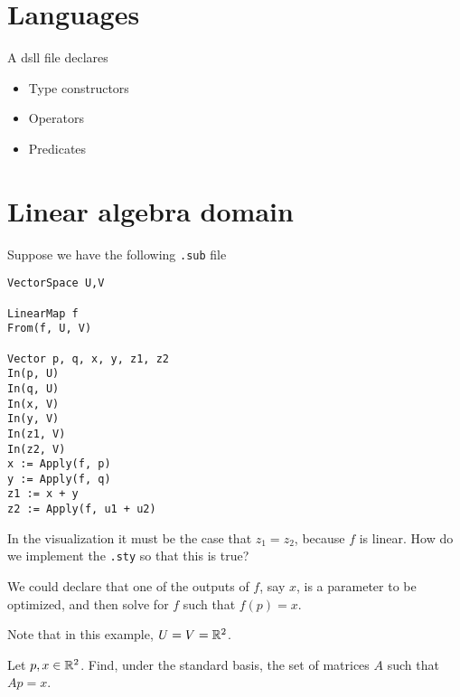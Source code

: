 \documentclass[12pt]{article}
\begin{document}
\section{Languages}
\begin{definition*}[dsll]
  A dsll file declares
  \begin{itemize}
  \item Type constructors
  \item Operators
  \item Predicates
  \end{itemize}
\end{definition*}

\newpage
\section{Linear algebra domain}

Suppose we have the following {\tt .sub} file
\begin{verbatim}
VectorSpace U,V

LinearMap f
From(f, U, V)

Vector p, q, x, y, z1, z2
In(p, U)
In(q, U)
In(x, V)
In(y, V)
In(z1, V)
In(z2, V)
x := Apply(f, p)
y := Apply(f, q)
z1 := x + y
z2 := Apply(f, u1 + u2)
\end{verbatim}

In the visualization it must be the case that $z_1 = z_2$, because $f$ is linear. How do we
implement the {\tt .sty} so that this is true?

We could declare that one of the outputs of $f$, say $x$, is a parameter to be optimized, and then
solve for $f$ such that $f(p) = x$.

Note that in this example, $U = V = \mathbb{R}^2$.

\begin{problem*}
  Let $p, x \in \mathbb{R}^2$. Find, under the standard basis, the set of matrices $A$ such that $Ap = x$.
\end{problem*}
\end{document}

